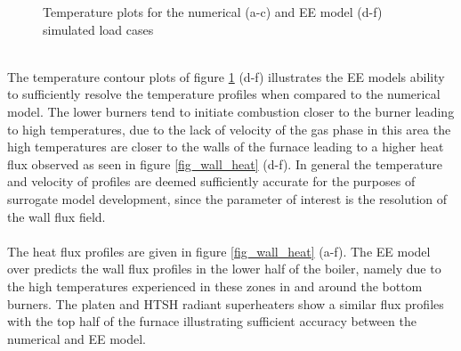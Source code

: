 \documentclass{webofc}
\begin{document}
\begin{figure}[h!]
\setlength{\belowcaptionskip}{0pt}
\caption{Temperature plots for the numerical (a-c) and EE model (d-f) simulated load cases}
\label{fig_temp}
\end{figure}\\
The temperature contour plots of figure \ref{fig_temp} (d-f) illustrates the EE models ability to sufficiently resolve the temperature profiles when compared to the numerical model. The lower burners tend to initiate combustion closer to the burner leading to high temperatures, due to the lack of velocity of the gas phase in this area the high temperatures  are closer to the walls of the furnace leading to a higher heat flux observed as seen in figure \ref{fig_wall_heat} (d-f). In general the temperature and velocity of profiles are deemed sufficiently accurate for the purposes of surrogate model development, since the parameter of interest is the resolution of the wall flux field.\\
\\
The heat flux profiles are given in figure \ref{fig_wall_heat} (a-f). The EE model over predicts the wall flux profiles in the lower half of the boiler, namely due to the high temperatures experienced in these zones in and around the bottom burners. The platen and HTSH radiant superheaters show a similar flux profiles with the top half of the furnace illustrating sufficient accuracy between the numerical and EE model.\\
\\
\\
\\
\\
\end{document}
